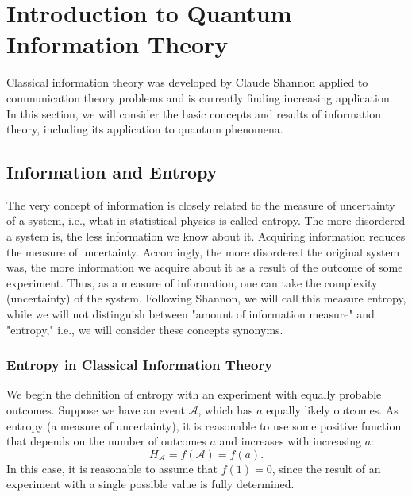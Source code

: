 \chapter{Introduction to Quantum Information Theory}
\label{chQuantInfo}

Classical information theory was developed by Claude Shannon
\cite{bShenon} applied to communication theory problems and is currently
finding increasing 
application. In this section, we will consider the basic concepts and results
of information theory, including its application to quantum phenomena.

\section{Information and Entropy}

The very concept of information is closely related to the measure of uncertainty
of a system, i.e., what in statistical physics is called
entropy. The more disordered a system is, the less information we
know about it. Acquiring information reduces the measure
of uncertainty. Accordingly, the more disordered the original
system was, the more information we acquire about it as a result of the outcome
of some experiment.
%
%
Thus, as a measure of information, one can take the complexity
(uncertainty) of the system. Following Shannon, we will call this
measure entropy, while we will not distinguish between
"amount of information measure" and "entropy," i.e., we will consider these
concepts synonyms.

\subsection{Entropy in Classical Information Theory}

We begin the definition of entropy with an experiment with equally probable outcomes.
Suppose we have an event $\mathcal{A}$,
which has $a$ equally likely outcomes. As entropy (a measure
of uncertainty), it is reasonable to use some positive function
that depends on the number of outcomes $a$ and increases with increasing $a$:
\begin{equation}
H_{\mathcal{A}} = f\left(\mathcal{A}\right) = f\left(a\right).
\nonumber
\end{equation}
In this case, it is reasonable to assume that $f\left(1\right) = 0$, since the result of an experiment with
a single possible value is fully determined.

